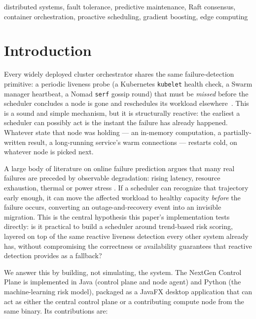 \documentclass[conference]{IEEEtran}
\begin{document}
\begin{IEEEkeywords}
distributed systems, fault tolerance, predictive maintenance, Raft consensus, container orchestration,
proactive scheduling, gradient boosting, edge computing
\end{IEEEkeywords}

\section{Introduction}

Every widely deployed cluster orchestrator shares the same failure-detection primitive: a periodic
liveness probe (a Kubernetes \texttt{kubelet} health check, a Swarm manager heartbeat, a Nomad
\texttt{serf} gossip round) that must be \emph{missed} before the scheduler concludes a node is gone
and reschedules its workload elsewhere~\cite{burns2016borg,verma2015borg}. This is a sound and simple
mechanism, but it is structurally reactive: the earliest a scheduler can possibly act is the instant
the failure has already happened. Whatever state that node was holding — an in-memory computation, a
partially-written result, a long-running service's warm connections — restarts cold, on whatever node
is picked next.

A large body of literature on online failure prediction argues that many real failures are preceded by
observable degradation: rising latency, resource exhaustion, thermal or power stress
\cite{salfner2010survey,susto2015machine}. If a scheduler can recognize that trajectory early enough,
it can move the affected workload to healthy capacity \emph{before} the failure occurs, converting an
outage-and-recovery event into an invisible migration. This is the central hypothesis this paper's
implementation tests directly: is it practical to build a scheduler around trend-based risk scoring,
layered on top of the same reactive liveness detection every other system already has, without
compromising the correctness or availability guarantees that reactive detection provides as a
fallback?

We answer this by building, not simulating, the system. The NextGen Control Plane is implemented in
Java (control plane and node agent) and Python (the machine-learning risk model), packaged as a
JavaFX desktop application that can act as either the central control plane or a contributing compute
node from the same binary. Its contributions are:
\end{document}
